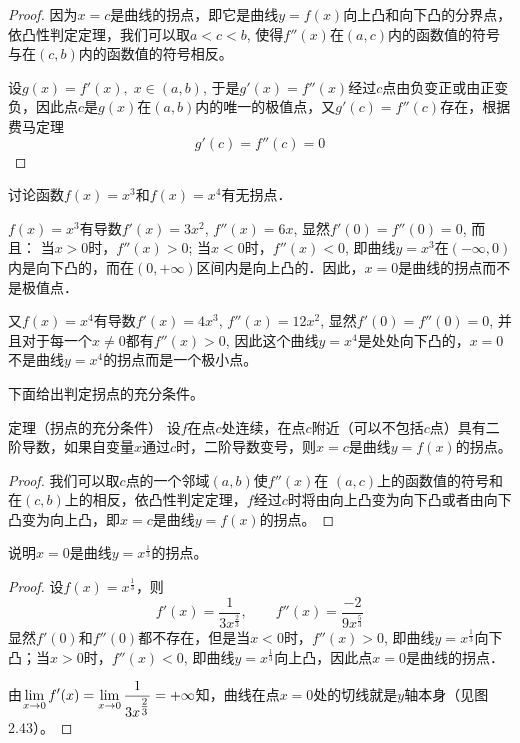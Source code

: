     \begin{proof}
        因为$x=c$是曲线的拐点，即它是曲线$y=f(x)$向上凸和向下凸的分界点，依凸性判定定理，我们可以取$a<c<b$, 使得$f''(x)$在$(a,c)$内的函数值的符号与在$(c,b)$内的函数值的符号相反。
    
    设$g(x)=f'(x),\; x\in (a,b)$, 于是$g'(x)=f''(x)$经过$c$点由负变正或由正变负，因此点$c$是$g(x)$在$(a,b)$内的唯一的极值点，又$g'(c)=f''(c)$存在，根据费马定理
    \[g' (c) =f'' (c) =0\]
    \end{proof}
    
    
    \begin{example}
        讨论函数$f(x)=x^3$和$f(x)=x^4$有无拐点．
    \end{example}
    
    
    \begin{solution}
        $f(x)=x^3$有导数$f'(x)=3x^2$, $f''(x)=6x$, 显然$f'(0)=f''(0)=0$, 而且：
    当$x>0$时，$f''(x)>0$; 当$x<0$时，$f''(x)<0$, 即曲线$y=x^3$在$(-\infty, 0)$内是向下凸的，而在$(0,+\infty)$区间内是向上凸的．因此，$x=0$是曲线的拐点而不是极值点．
    
    又$f(x)=x^4$有导数$f'(x)=4x^3$, $f''(x)=12x^2$, 显然$f'(0)=f''(0)=0$, 并且对于每一个$x\ne 0$都有$f''(x)>0$, 因此这个曲线$y=x^4$是处处向下凸的，$x=0$不是曲线$y=x^4$的拐点而是一个极小点。
    \end{solution}
    
    
    下面给出判定拐点的充分条件。
        
    \begin{blk}
       {定理（拐点的充分条件）} 设$f$在点$c$处连续，在点$c$附近（可以不包括$c$点）具有二阶导数，如果自变量$x$通过$c$时，二阶导数变号，则$x=c$是曲线$y=f(x)$的拐点。
    \end{blk}
    
    \begin{proof}
        我们可以取$c$点的一个邻域$(a,b)$使$f''(x)$在
    $(a,c)$上的函数值的符号和在$(c,b)$上的相反，依凸性判定定理，$f$经过$c$时将由向上凸变为向下凸或者由向下凸变为向上凸，即$x=c$是曲线$y=f(x)$的拐点。
    \end{proof}
    
    
    \begin{example}
    说明$x=0$是曲线$y=x^{\tfrac{1}{3}}$的拐点。
    \end{example}
    
    \begin{proof}
        设$f(x)=x^{\tfrac{1}{3}}$，则
    \[f'(x)=\frac{1}{3x^{\tfrac{2}{3}}},\qquad f''(x)=\frac{-2}{9x^{\tfrac{5}{3}}}\]
    显然$f'(0)$和$f''(0)$都不存在，但是当$x<0$时，$f''(x)>0$, 即曲线$y=x^{\tfrac{1}{3}}$向下凸；当$x>0$时，$f''(x)<0$, 即曲线$y=x^{\tfrac{1}{3}}$向上凸，因此点$x=0$是曲线的拐点．
    
    由$\displaystyle\lim_{x\to 0}f'(x)=\displaystyle\lim_{x\to 0}\dfrac{1}{3x^{\tfrac{2}{3}}}=+\infty$知，曲线在点$x=0$处的切线就是$y$轴本身（见图2.43）。
    \end{proof}
    
